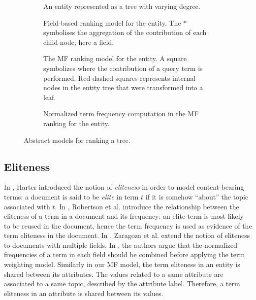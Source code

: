 \begin{figure}[t]
    \centering
    \begin{subfigure}{0.3\textwidth}
    	\centering
      	
    	\caption{An entity represented as a tree with varying degree.}
		\label{fig:concept-tree}
    \end{subfigure}
  	\quad
  	\begin{subfigure}{0.3\textwidth}
  		\centering
  		
  		\caption{Field-based ranking model for the entity. The $*$ symbolises the aggregation of the contribution of each child node, here a field.}
		\label{fig:field-model}
  	\end{subfigure}
  	\quad
  	\begin{subfigure}{0.3\textwidth}
  		\centering
  		
  		\caption{The MF ranking model for the entity. A square symbolizes where the contribution of a query term is performed. Red dashed squares represents internal nodes in the entity tree that were transformed into a leaf.}
		\label{fig:mf-model}
  	\end{subfigure}
  	\quad
  	\begin{subfigure}{\textwidth}
  		\centering
	  	
  		\caption{Normalized term frequency computation in the MF ranking for the entity.}
  		\label{fig:mf-ranking}
  	\end{subfigure}
	\caption{Abstract models for ranking a tree.}
	\label{fig:tree}
\end{figure}

\subsection{Eliteness}

In \cite{harter:1974:thesis}, Harter introduced the notion of \emph{eliteness} in order to model content-bearing terms: a document is said to be \emph{elite} in term $t$ if it is somehow ``about'' the topic associated with $t$. In \cite{robertson:1981:PMI}, Robertson et al. introduce the relationship between the eliteness of a term in a document and its frequency: an elite term is most likely to be reused in the document, hence the term frequency is used as evidence of the term eliteness in the document. In \cite{zaragoza:2004:microsoft}, Zaragoza et al. extend the notion of eliteness to documents with multiple fields. In \cite{robertson:2004:cikm}, the authors argue that the normalized frequencies of a term in each field should be combined before applying the term weighting model. Similarly in our MF model, the term eliteness in an entity is shared between its attributes. The values related to a same attribute are associated to a same topic, described by the attribute label. Therefore, a term eliteness in an attribute is shared between its values.

